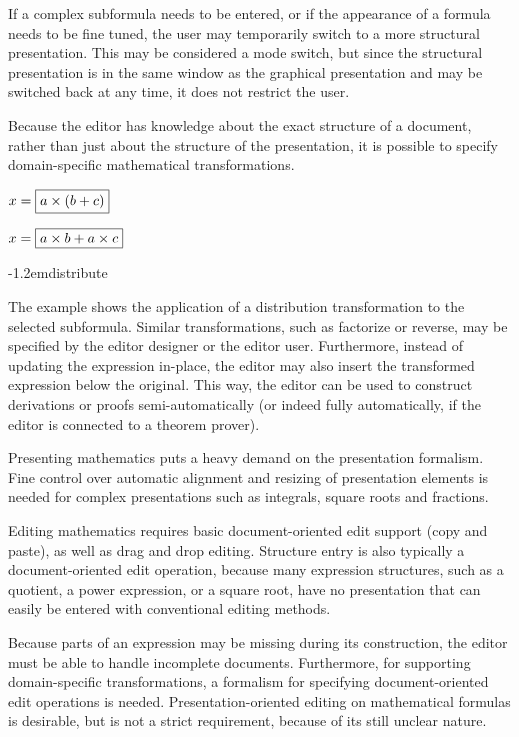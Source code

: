 \documentclass{speauth}
\begin{document}
If a complex subformula needs to be entered, or if the appearance of a formula needs to be fine tuned, the user may temporarily switch to a more structural presentation. This may be considered a mode switch, but since the structural presentation is in the same window as the graphical presentation and may be switched back at any time, it does not restrict the user.


Because the editor has knowledge about the exact structure of a document, rather than just about the structure of the presentation, it is possible to specify domain-specific mathematical transformations.

\editStepScrshot
{\begin{scriptsize}$x = \framebox{$a \times (b + c)$}$\end{scriptsize}}
{\begin{scriptsize}$x = \framebox{$a \times b + a \times c$}$\end{scriptsize}}
{-1.2em}{\small distribute}

The example shows the application of a distribution transformation to the selected subformula. Similar transformations, such as factorize or reverse, may be specified by the editor designer or the editor user. Furthermore, instead of updating the expression in-place, the editor may also insert the transformed expression below the original. This way, the editor can be used to construct derivations or proofs semi-automatically (or indeed fully automatically, if the editor is connected to a theorem prover).


Presenting mathematics puts a heavy demand on the presentation formalism. Fine control over automatic alignment and resizing of presentation elements is needed for complex presentations such as integrals, square roots and fractions. 

Editing mathematics requires basic document-oriented edit support (copy and paste), as well as drag and drop editing. Structure entry is also typically a document-oriented edit operation, because many expression structures, such as a quotient, a power expression, or a square root, have no presentation that can easily be entered with conventional editing methods.

Because parts of an expression may be missing during its construction,  the editor must be able to handle incomplete documents. Furthermore, for supporting domain-specific transformations, a formalism for specifying document-oriented edit operations is needed. Presentation-oriented editing on mathematical formulas is desirable, but is not a strict requirement, because of its still unclear nature.
\end{document}

